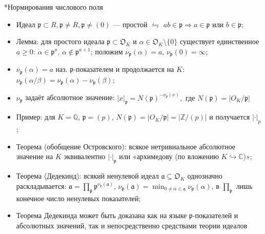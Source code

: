 \documentclass[serif, aspectratio=169]{beamer}
\newcommand{\sagemark}{%
  \textcolor{green!40!black}{\textbf{\texttt{sage:...}}}%
}
\begin{document}
\begin{frame}{*Нормирования числового поля}
    \begin{itemize}
        \item Идеал $\mathfrak p\subset R, \mathfrak p \neq R, \mathfrak p \neq (0)$ --- простой $\leftrightharpoons$ $ab\in\mathfrak p \Rightarrow a\in\mathfrak p$ или $b\in\mathfrak p$;
        \item Лемма: для простого идеала $\mathfrak p\subset\mathfrak O_K$ и $\alpha\in\mathfrak O_K\setminus\{0\}$ существует единственное $a\geqslant0$: $\alpha\in\mathfrak p^a$, $\alpha\notin\mathfrak p^{a+1}$; положим $\nu_{\mathfrak p}(\alpha)=a$, $\nu_{\mathfrak p}(0)=\infty$;
        \item $\nu_{\mathfrak{p}}(\alpha)=a$ наз. $\mathfrak{p}$-показателем и продолжается на $K$: $\nu_{\mathfrak{p}}(\alpha/\beta)=\nu_{\mathfrak{p}}(\alpha)-\nu_{\mathfrak{p}}(\beta)$;
        \item $\nu_{\mathfrak{p}}$ задаёт абсолютное значение: $|x|_{\mathfrak{p}}=N(\mathfrak{p})^{-\nu_{\mathfrak{p}}(x)}, \text{ где } N(\mathfrak{p})=|O_K/\mathfrak{p}|$
        \item Пример: для $K=\mathbb{Q}$, $\mathfrak{p}=(p)$, $N(\mathfrak{p})=|O_K/\mathfrak{p}|=|\mathbb{Z}/(p)|$ и получается $|\cdot|_p$;
        \item Теорема (обобщение Островского): всякое нетривиальное абсолютное значение на $K$ эквивалентно $|\cdot|_{\mathfrak{p}}$ или «архимедову (по вложению $K\hookrightarrow\mathbb{C}$)»;
        \item Теорема (Дедекинд): всякий ненулевой идеал $\mathfrak a\subseteq\mathfrak O_K$ однозначно раскладывается: $\mathfrak a=\prod_{\mathfrak p} \mathfrak p^{\nu_{\mathfrak p}(\mathfrak a)}$, $\nu_{\mathfrak p}(\mathfrak a)= \min_{0\neq\alpha\in\mathfrak a} \nu_{\mathfrak p}(\alpha)$, в $\prod_{\mathfrak p}$ лишь конечное число ненулевых показателей;
        \item Теорема Дедекинда может быть доказана как на языке $\mathfrak{p}$-показателей и абсолютных значений, так и непосредственно средствами теории идеалов
    \end{itemize}

\end{frame}
\end{document}
